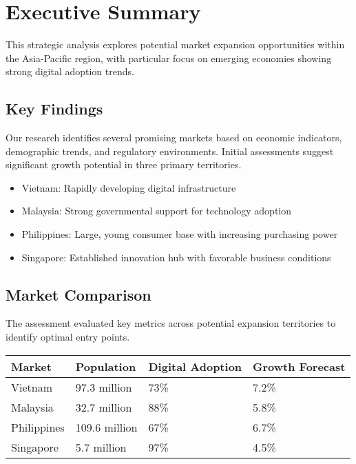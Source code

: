 \documentclass[11pt,a4paper]{article}
\begin{document}

\templateTwoTable

\section{Executive Summary}

\color{primary}
This strategic analysis explores potential market expansion opportunities within the Asia-Pacific region, with particular focus on emerging economies showing strong digital adoption trends.

\subsection{Key Findings}

Our research identifies several promising markets based on economic indicators, demographic trends, and regulatory environments. Initial assessments suggest significant growth potential in three primary territories.

\begin{itemize}
  \item Vietnam: Rapidly developing digital infrastructure
  \item Malaysia: Strong governmental support for technology adoption
  \item Philippines: Large, young consumer base with increasing purchasing power
  \item Singapore: Established innovation hub with favorable business conditions
\end{itemize}

\subsection{Market Comparison}

The assessment evaluated key metrics across potential expansion territories to identify optimal entry points.

\begin{center}
\begin{tabularx}{\textwidth}{|X|X|X|X|}
\hline
\textbf{Market} & \textbf{Population} & \textbf{Digital Adoption} & \textbf{Growth Forecast} \\
\hline
Vietnam & 97.3 million & 73\% & 7.2\% \\
\hline
Malaysia & 32.7 million & 88\% & 5.8\% \\
\hline
Philippines & 109.6 million & 67\% & 6.7\% \\
\hline
Singapore & 5.7 million & 97\% & 4.5\% \\
\hline
\end{tabularx}
\end{center}
\end{document}
